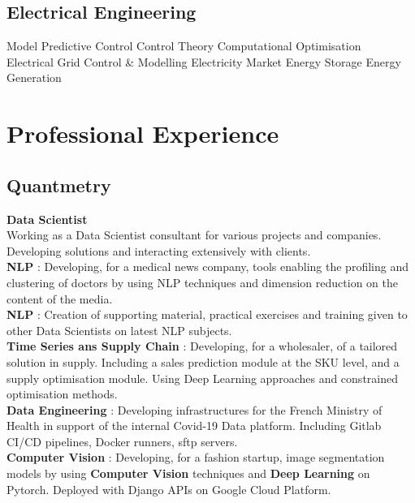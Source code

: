 \documentclass{article}
\newcommand{\descript}[1]{\color{darkgray}\normalfont \textbf{#1\\}}
\newcommand{\longdescript}[1]{\color{subheadings}\normalfont\small {#1\\} }
\newcommand{\location}[1]{\color{primary}\headingfont {\hfill #1\\} }
\newcommand{\sectionsep}[0]{\vspace{-6pt}}
\newcommand{\mybullet}[1]{ \hspace{2pt}\textbullet{#1}\hspace{2pt} }
\begin{document}
\subsection{Electrical Engineering}
\longdescript{ \mybullet{} Model Predictive Control \mybullet{} Control Theory \mybullet{} Computational Optimisation \\  \hspace*{3pt}  Electrical Grid Control \& Modelling \mybullet{} Electricity Market \mybullet{} Energy Storage \mybullet{} Energy Generation}
\sectionsep




\section{Professional Experience}

\subsection{Quantmetry}
\location{Paris, France | Sept 2019 - Today}
\descript{Data Scientist}
\longdescript{Working as a Data Scientist consultant for various projects and companies. Developing solutions and interacting extensively with clients.  \\ \textbf{NLP} : Developing, for a medical news company, tools enabling the profiling and clustering of doctors by using NLP techniques and dimension reduction on the content of the media. \\ \textbf{NLP} : Creation of supporting material, practical exercises and training given to other Data Scientists on latest NLP subjects. \\ \textbf{Time Series ans Supply Chain} : Developing, for a wholesaler, of a tailored solution in supply. Including a sales prediction module at the SKU level, and a supply optimisation module. Using Deep Learning approaches and constrained optimisation methods.\\ \textbf{Data Engineering} : Developing infrastructures for the French Ministry of Health in support of the internal Covid-19 Data platform. Including Gitlab CI/CD pipelines, Docker runners, sftp servers. \\ \textbf{Computer Vision} : Developing, for a fashion startup, image segmentation models by using \textbf{Computer Vision} techniques and \textbf{Deep Learning} on Pytorch. Deployed with Django APIs on Google Cloud Platform. } 
\sectionsep
\end{document}
